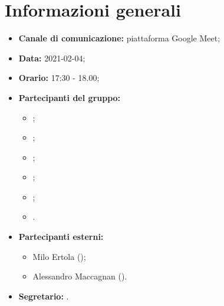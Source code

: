 \section{Informazioni generali}
\begin{itemize}
\item \textbf{Canale di comunicazione:} piattaforma Google Meet;
\item \textbf{Data:} 2021-02-04;
\item \textbf{Orario:} 17:30 - 18.00;
\item \textbf{Partecipanti del gruppo:}
	\begin{itemize}
	\item \MDI ;
	\item \MB ;
	\item \GB ;
	\item \SB ;
	\item \NM ;
	\item \FD .
	\end{itemize}
\item \textbf{Partecipanti esterni:}
	\begin{itemize}
	\item Milo Ertola (\Proponente);
	\item Alessandro Maccagnan (\Proponente).
	\end{itemize}
\item \textbf{Segretario:} \SB .

\end{itemize}